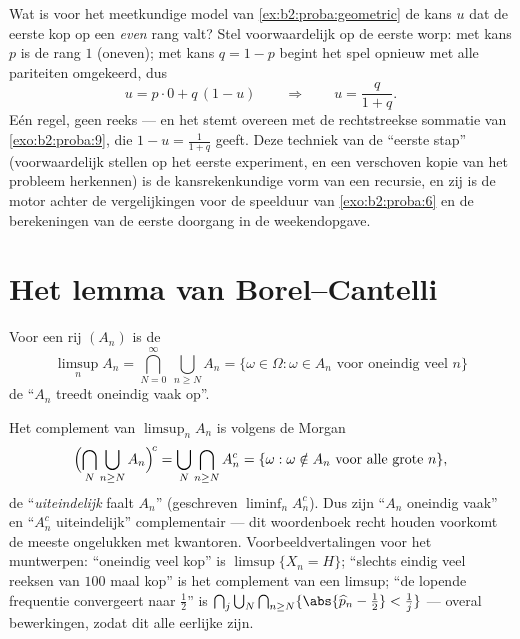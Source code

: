 \begin{example}\label{ex:b2:proba:firststep}
Wat is voor het meetkundige model van
\cref{ex:b2:proba:geometric} de kans $u$ dat de eerste kop op een
\emph{even} rang valt? Stel voorwaardelijk op de eerste worp: met
kans $p$ is de rang $1$ (oneven); met kans $q = 1 - p$ begint het
spel opnieuw met alle pariteiten omgekeerd, dus
\[
u = p\cdot0 + q\,(1 - u)
\qquad\Longrightarrow\qquad
u = \frac{q}{1 + q} .
\]
Eén regel, geen reeks --- en het stemt overeen met de
rechtstreekse sommatie van \cref{exo:b2:proba:9}, die $1 - u =
\frac1{1+q}$ geeft. Deze techniek van de ``eerste stap''
(voorwaardelijk stellen op het eerste experiment, en een verschoven
kopie van het probleem herkennen) is de kansrekenkundige vorm van
een recursie, en zij is de motor achter de vergelijkingen voor de
speelduur van \cref{exo:b2:proba:6} en de berekeningen van de
eerste doorgang in de weekendopgave.
\end{example}

\section{Het lemma van Borel--Cantelli}

\begin{definition}\label{def:b2:proba:limsup}
Voor een rij $(A_n)$  is de 
\[
\limsup_n A_n
= \bigcap_{N=0}^{\infty}\ \bigcup_{n \geq N} A_n
= \{\omega \in \Omega : \omega \in A_n
\text{ voor oneindig veel } n\}
\]
de  ``$A_n$ treedt oneindig vaak op''.
\end{definition}

\begin{example}\label{ex:b2:proba:limsuplang}
Het complement van $\limsup_nA_n$ is volgens de Morgan
\[
\Bigl(\bigcap_N\bigcup_{n\geq N}A_n\Bigr)^{\!c}
= \bigcup_N\bigcap_{n\geq N}A_n^c
= \{\omega : \omega \notin A_n \text{ voor alle grote }n\},
\]
de  ``\emph{uiteindelijk} faalt $A_n$'' (geschreven
$\liminf_nA_n^c$). Dus zijn ``$A_n$ oneindig vaak'' en ``$A_n^c$
uiteindelijk'' complementair --- dit woordenboek recht houden
voorkomt de meeste ongelukken met kwantoren. Voorbeeldvertalingen
voor het muntwerpen: ``oneindig veel kop'' is $\limsup\{X_n =
H\}$; ``slechts eindig veel reeksen van $100$ maal kop'' is het
complement van een limsup; ``de lopende frequentie convergeert naar
$\frac12$'' is $\bigcap_j\bigcup_N\bigcap_{n\geq N}\{\abs{\widehat
p_n - \tfrac12} < \tfrac1j\}$ --- overal  bewerkingen,
zodat dit alle eerlijke  zijn.
\end{example}

